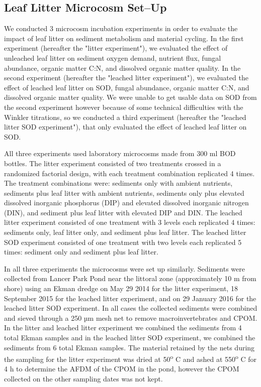\subsection{Leaf Litter Microcosm Set--Up}
We conducted 3 microcosm incubation experiments in order to evaluate the impact of leaf litter on sediment metabolism and material cycling. In the first experiment (hereafter the "litter experiment"), we evaluated the effect of unleached leaf litter on sediment oxygen demand, nutrient flux, fungal abundance, organic matter C:N, and dissolved organic matter quality. In the second experiment (hereafter the "leached litter experiment"), we evaluated the effect of leached leaf litter on SOD, fungal abundance, organic matter C:N, and dissolved organic matter quality. We were unable to get usable data on SOD from the second experiment however because of some technical difficulties with the Winkler titrations, so we conducted a third experiment (hereafter the "leached litter SOD experiment"), that only evaluated the effect of leached leaf litter on SOD.

All three experiments used laboratory microcosms made from 300 ml BOD bottles. The litter experiment consisted of two treatments crossed in a randomized factorial design, with each treatment combination replicated 4 times. The treatment combinations were: sediments only with ambient nutrients, sediments plus leaf litter with ambient nutrients, sediments only plus elevated dissolved inorganic phosphorus (DIP) and elevated dissolved inorganic nitrogen (DIN), and sediment plus leaf litter with elevated DIP and DIN. The leached litter experiment consisted of one treatment with 3 levels each replicated 4 times: sediments only, leaf litter only, and sediment plus leaf litter.  The leached litter SOD experiment consisted of one treatment with two levels each replicated 5 times: sediment only and sediment plus leaf litter. 

In all three experiments the microcosms were set up similarly. Sediments were collected from Lancer Park Pond near the littoral zone (approximately 10 m from shore) using an Ekman dredge on May 29 2014 for the litter experiment, 18 September 2015 for the leached litter experiment, and on 29 January 2016 for the leached litter SOD experiment.  In all cases the collected sediments were combined and sieved through a 250 µm mesh net to remove macroinvertebrates and CPOM. In the litter and leached litter experiment we combined the sediments from 4 total Ekman samples and in the leached litter SOD experiment, we combined the sediments from 6 total Ekman samples. The material retained by the nets during the sampling for the litter experiment was dried at 50\textsuperscript{o} C and ashed at 550\textsuperscript{o} C for 4 h to determine the AFDM of the CPOM in the pond, however the CPOM collected on the other sampling dates was not kept. 

